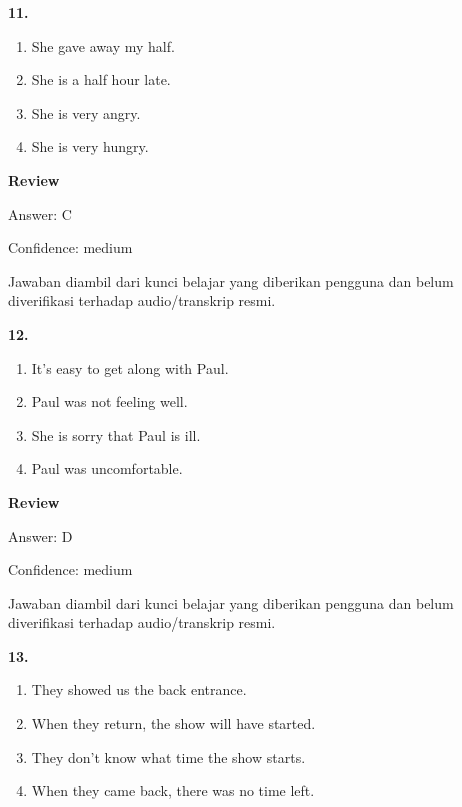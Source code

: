 \documentclass[12pt]{article}
\begin{document}
\endgroup
\par
\vspace{0.25\baselineskip}
\noindent\textbf{11.}
\begin{enumerate}[label=(\Alph*),leftmargin=*,itemsep=0.2em]
\item She gave away my half.
\item She is a half hour late.
\item She is very angry.
\item She is very hungry.
\end{enumerate}
\par
\begingroup
\setlength{\parskip}{0pt}
\setlength{\parindent}{0pt}
\textbf{Review}\par
Answer: C\par
Confidence: medium\par
Jawaban diambil dari kunci belajar yang diberikan pengguna dan belum diverifikasi terhadap audio/transkrip resmi.\par
\endgroup
\par
\vspace{0.25\baselineskip}
\noindent\textbf{12.}
\begin{enumerate}[label=(\Alph*),leftmargin=*,itemsep=0.2em]
\item It's easy to get along with Paul.
\item Paul was not feeling well.
\item She is sorry that Paul is ill.
\item Paul was uncomfortable.
\end{enumerate}
\par
\begingroup
\setlength{\parskip}{0pt}
\setlength{\parindent}{0pt}
\textbf{Review}\par
Answer: D\par
Confidence: medium\par
Jawaban diambil dari kunci belajar yang diberikan pengguna dan belum diverifikasi terhadap audio/transkrip resmi.\par
\endgroup
\par
\vspace{0.25\baselineskip}
\noindent\textbf{13.}
\begin{enumerate}[label=(\Alph*),leftmargin=*,itemsep=0.2em]
\item They showed us the back entrance.
\item When they return, the show will have started.
\item They don't know what time the show starts.
\item When they came back, there was no time left.
\end{enumerate}
\end{document}
